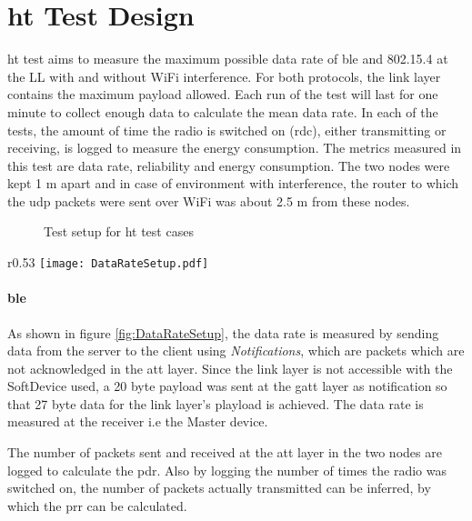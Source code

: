 \section{\acrfull{ht} Test Design} \label{6HTdesign}
\gls{ht} test aims to measure the maximum possible data rate of \gls{ble} and 802.15.4 at the LL with and without WiFi interference. For both protocols, the link layer contains the maximum payload allowed. Each run of the test will last for one minute to collect enough data to calculate the mean data rate. In each of the tests, the amount of time the radio is switched on (\gls{rdc}), either transmitting or receiving, is logged to measure the energy consumption. The metrics measured in this test are data rate, reliability and energy consumption. The two nodes were kept 1 m apart and in case of environment with interference, the router to which the \gls{udp} packets were sent over WiFi was about 2.5 m from these nodes.

\begin{figure}[h]
\def\svgwidth{\columnwidth}

\caption{Test setup for \gls{ht} test cases}
\label{fig:layout}
\end{figure}

\begin{wrapfigure}{r}{0.53\textwidth}
	\vspace{-15pt}
	\centering
	\texttt{[image: DataRateSetup.pdf]}
	\caption{Setup to measure data rate with \gls{ble}}
    \label{fig:DataRateSetup}
   	\vspace{-15pt}
\end{wrapfigure}

\paragraph{\gls{ble} } As shown in figure \ref{fig:DataRateSetup}, the data rate is measured by sending data from the server to the client using \emph{Notifications}, which are packets which are not acknowledged in the \gls{att} layer. Since the link layer is not accessible with the SoftDevice used, a 20 byte payload was sent at the \gls{gatt} layer as notification so that 27 byte data for the link layer's playload is achieved. The data rate is measured at the receiver i.e the Master device. 

The number of packets sent and received at the \gls{att} layer in the two nodes are logged to calculate the \gls{pdr}. Also by logging the number of times the radio was switched on, the number of packets actually transmitted can be inferred, by which the \gls{prr} can be calculated.

